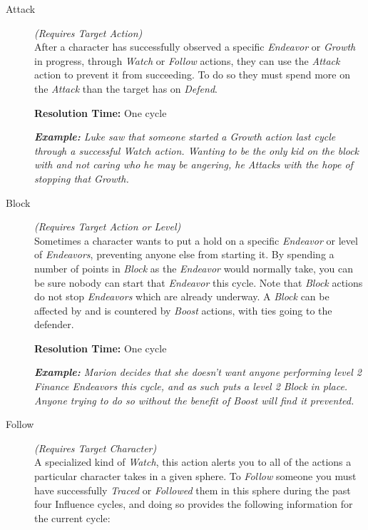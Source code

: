 \begin{description}
	\item[Attack] \emph{(Requires Target Action)} \hfill \\
		After a character has successfully observed a specific \emph{Endeavor} or \emph{Growth} in progress, 
		through \emph{Watch} or \emph{Follow} actions, they can use the \emph{Attack} action to prevent it 
		from succeeding.  To do so they must spend more on the \emph{Attack} than the target has on \emph{Defend}.
		
		\textbf{Resolution Time:} One cycle
		
		\emph{\textbf{Example:} Luke saw that someone started a \emph{Growth} action last cycle through a 
		successful \emph{Watch} action.  Wanting to be the only kid on the block with and not 
		caring who he may be angering, he \emph{Attacks} with the hope of stopping that \emph{Growth}.} \\
		
	\item[Block] \emph{(Requires Target Action or Level)} \hfill \\
		Sometimes a character wants to put a hold on a specific \emph{Endeavor} or level of \emph{Endeavors}, 
		preventing anyone else from starting it.  By spending a number of points in \emph{Block} as the \emph{Endeavor} 
		would normally take, you can be sure nobody can start that \emph{Endeavor} this cycle.  Note that 
		\emph{Block} actions do not stop \emph{Endeavors} which are already underway.  A \emph{Block} can be 
		affected by and is countered by \emph{Boost} actions, with ties going to the defender.
		
		\textbf{Resolution Time:} One cycle
		
		\emph{\textbf{Example:} Marion decides that she doesn't want anyone performing level 2 Finance 
		\emph{Endeavors} this cycle, and as such puts a level 2 \emph{Block} in place.  Anyone trying 
		to do so without the benefit of \emph{Boost} will find it prevented.} \\
		
	\item[Follow] \emph{(Requires Target Character)} \hfill \\
		A specialized kind of \emph{Watch}, this action alerts you to all of the actions a particular character 
		takes in a given sphere.  To \emph{Follow} someone you must have successfully \emph{Traced} or 
		\emph{Followed} them in this sphere during the past four Influence cycles, and doing so provides the 
		following information for the current cycle:
		

\end{description}
